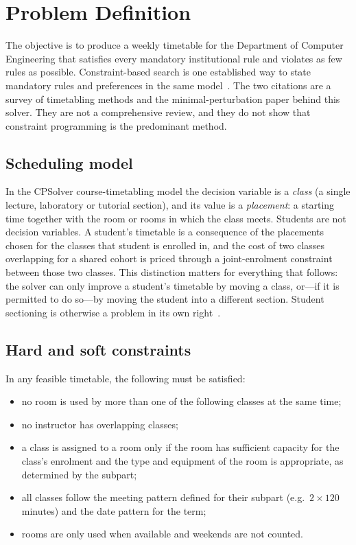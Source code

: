 \section{Problem Definition}
\label{sec:problem}

The objective is to produce a weekly timetable for the Department
of Computer Engineering that satisfies every mandatory institutional rule and violates as few
rules as possible. Constraint-based search is one established way to state mandatory rules and
preferences in the same model~\cite{schaerf1999survey,muller2007}. The two citations are a survey
of timetabling methods and the minimal-perturbation paper behind this solver. They are not a
comprehensive review, and they do not show that constraint programming is the predominant method.

\subsection{Scheduling model}

In the CPSolver course-timetabling model the decision variable is a \emph{class} (a single lecture,
laboratory or tutorial section), and its value is a \emph{placement}: a starting time together with
the room or rooms in which the class meets. Students are not decision variables. A student's
timetable is a consequence of the placements chosen for the classes that student is enrolled in, and
the cost of two classes overlapping for a shared cohort is priced through a joint-enrolment
constraint between those two classes. This distinction matters for everything that follows: the
solver can only improve a student's timetable by moving a class, or---if it is permitted to do
so---by moving the student into a different section. Student sectioning is otherwise a problem in its own right~\cite{muller2010sectioning}.

\subsection{Hard and soft constraints}

In any feasible timetable, the following must be satisfied:

\begin{itemize}
  \item no room is used by more than one of the following classes at the same time;
  \item no instructor has overlapping classes;
  \item a class is assigned to a room only if the room has sufficient capacity for the class's
    enrolment and the type and equipment of the room is appropriate, as determined by the subpart;
  \item all classes follow the meeting pattern defined for their subpart (e.g.\ $2\times120$
    minutes) and the date pattern for the term;
  \item rooms are only used when available and weekends are not counted.
\end{itemize}

